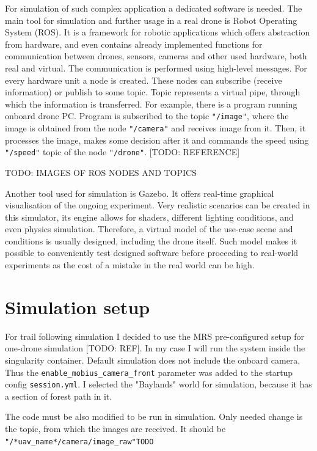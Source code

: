 For simulation of such complex application a dedicated software is needed. The main tool for simulation and further usage in a real drone is Robot Operating System (ROS). It is a framework for robotic applications which offers abstraction from hardware, and even contains already implemented functions for communication between drones, sensors, cameras and other used hardware, both real and virtual. 
The communication is performed using high-level messages. For every hardware unit a node is created. These nodes can subscribe (receive information) or publish to some topic. Topic represents a virtual pipe, through which the information is transferred. For example, there is a program running onboard drone PC. Program is subscribed to the topic \texttt{"/image"}, where the image is obtained from the node \texttt{"/camera"} and receives image from it. Then, it processes the image, makes some decision after it and commands the speed using \texttt{"/speed"} topic of the node \texttt{"/drone"}. [TODO: REFERENCE]

TODO: IMAGES OF ROS NODES AND TOPICS

Another tool used for simulation is Gazebo. It offers real-time graphical visualisation of the ongoing experiment. Very realistic scenarios can be created in this simulator, its engine allows for shaders, different lighting conditions, and even physics simulation. Therefore, a virtual model of the use-case scene and conditions is usually designed, including the drone itself. Such model makes it possible to conveniently test designed software before proceeding to real-world experiments as the cost of a mistake in the real world can be high. 

\section{Simulation setup}

For trail following simulation I decided to use the MRS pre-configured setup for one-drone simulation [TODO: REF]. In my case I will run the system inside the singularity container. Default simulation does not include the onboard camera. Thus the \newline \texttt{enable\_mobius\_camera\_front} parameter was added to the startup config \texttt{session.yml}. I selected the "Baylands" world for simulation, because it has a section of forest path in it. 

The code must be also modified to be run in simulation. Only needed change is the topic, from which the images are received. It should be \texttt{"/*uav\_name*/camera/image\_raw"TODO}

